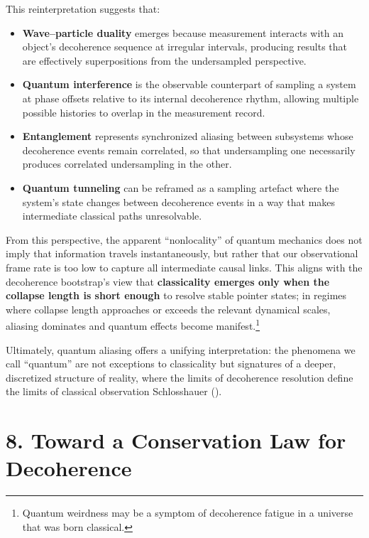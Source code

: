 \documentclass[
]{article}
\providecommand{\tightlist}{%
  \setlength{\itemsep}{0pt}\setlength{\parskip}{0pt}}
\begin{document}
This reinterpretation suggests that:

\begin{itemize}
\tightlist
\item
  \textbf{Wave--particle duality} emerges because measurement interacts
  with an object's decoherence sequence at irregular intervals,
  producing results that are effectively superpositions from the
  undersampled perspective.
\item
  \textbf{Quantum interference} is the observable counterpart of
  sampling a system at phase offsets relative to its internal
  decoherence rhythm, allowing multiple possible histories to overlap in
  the measurement record.
\item
  \textbf{Entanglement} represents synchronized aliasing between
  subsystems whose decoherence events remain correlated, so that
  undersampling one necessarily produces correlated undersampling in the
  other.
\item
  \textbf{Quantum tunneling} can be reframed as a sampling artefact
  where the system's state changes between decoherence events in a way
  that makes intermediate classical paths unresolvable.
\end{itemize}

From this perspective, the apparent ``nonlocality'' of quantum mechanics
does not imply that information travels instantaneously, but rather that
our observational frame rate is too low to capture all intermediate
causal links. This aligns with the decoherence bootstrap's view that
\textbf{classicality emerges only when the collapse length is short
enough} to resolve stable pointer states; in regimes where collapse
length approaches or exceeds the relevant dynamical scales, aliasing
dominates and quantum effects become manifest.\footnote{Quantum
  weirdness may be a symptom of decoherence fatigue in a universe that
  was born classical.}

Ultimately, quantum aliasing offers a unifying interpretation: the
phenomena we call ``quantum'' are not exceptions to classicality but
signatures of a deeper, discretized structure of reality, where the
limits of decoherence resolution define the limits of classical
observation Schlosshauer ().

\section{8. Toward a Conservation Law for
Decoherence}\label{toward-a-conservation-law-for-decoherence}
\end{document}
